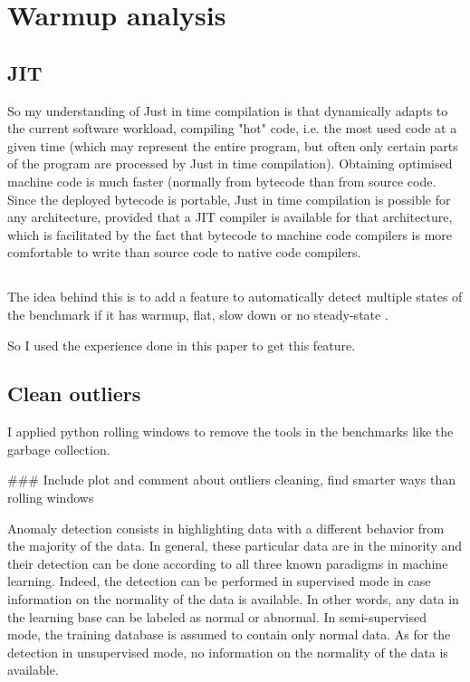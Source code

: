 \documentclass{article}
\begin{document}
\section{Warmup analysis}

\subsection{JIT}


So my understanding of Just in time compilation is that dynamically adapts to the current software workload, compiling "hot" code, i.e. the most used code at a given time (which may represent the entire program, but often only certain parts of the program are processed by Just in time compilation). Obtaining optimised machine code is much faster (normally from bytecode than from source code. Since the deployed bytecode is portable, Just in time compilation is possible for any architecture, provided that a JIT compiler is available for that architecture, which is facilitated by the fact that bytecode to machine code compilers is more comfortable to write than source code to native code compilers.

\subsection{\cite{barrett2017virtual}}

The idea behind this is to add a feature to automatically detect multiple states of the benchmark if it has warmup, flat, slow down or no steady-state \cite{barrett2017virtual}. 

So I used the experience done in this paper to get this feature.

\subsection{Clean outliers}

I applied python rolling windows to remove the tools in the benchmarks like the garbage collection.

\#\#\# Include plot and comment about outliers cleaning, find smarter ways than rolling windows

Anomaly detection consists in highlighting data with a different behavior from the majority of the data. In general, these
particular data are in the minority and their detection can be done according to all three known paradigms in machine learning. Indeed, the detection can be performed in supervised mode in case information on the normality of the data is available. In other words, any data in the learning base can be labeled as normal or abnormal. In semi-supervised mode, the training database is assumed to contain only normal data. 
As for the detection in unsupervised mode, no information on the normality of the data is available. 
\end{document}
